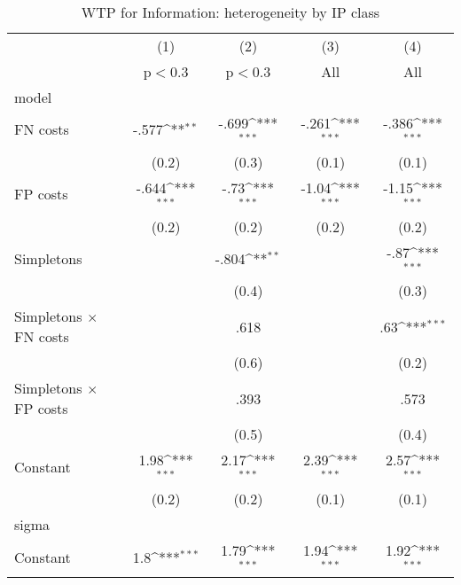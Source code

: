 \begin{table}[htbp]\centering
\def\sym#1{\ifmmode^{#1}\else\(^{#1}\)\fi}
\caption{WTP for Information: heterogeneity by IP class}
\begin{tabular}{l*{4}{c}}
\hline\hline
                &\multicolumn{1}{c}{(1)}&\multicolumn{1}{c}{(2)}&\multicolumn{1}{c}{(3)}&\multicolumn{1}{c}{(4)}\\
                &\multicolumn{1}{c}{p$<$0.3}&\multicolumn{1}{c}{p$<$0.3}&\multicolumn{1}{c}{All}&\multicolumn{1}{c}{All}\\
\hline
model           &                  &                  &                  &                  \\
FN costs        &    -.577\sym{**} &    -.699\sym{***}&    -.261\sym{***}&    -.386\sym{***}\\
                &    (0.2)         &    (0.3)         &    (0.1)         &    (0.1)         \\
FP costs        &    -.644\sym{***}&     -.73\sym{***}&    -1.04\sym{***}&    -1.15\sym{***}\\
                &    (0.2)         &    (0.2)         &    (0.2)         &    (0.2)         \\
Simpletons      &                  &    -.804\sym{**} &                  &     -.87\sym{***}\\
                &                  &    (0.4)         &                  &    (0.3)         \\
Simpletons $\times$ FN costs&                  &     .618         &                  &      .63\sym{***}\\
                &                  &    (0.6)         &                  &    (0.2)         \\
Simpletons $\times$ FP costs&                  &     .393         &                  &     .573         \\
                &                  &    (0.5)         &                  &    (0.4)         \\
Constant        &     1.98\sym{***}&     2.17\sym{***}&     2.39\sym{***}&     2.57\sym{***}\\
                &    (0.2)         &    (0.2)         &    (0.1)         &    (0.1)         \\
\hline
sigma           &                  &                  &                  &                  \\
Constant        &      1.8\sym{***}&     1.79\sym{***}&     1.94\sym{***}&     1.92\sym{***}\\

\end{tabular}
\end{table}
